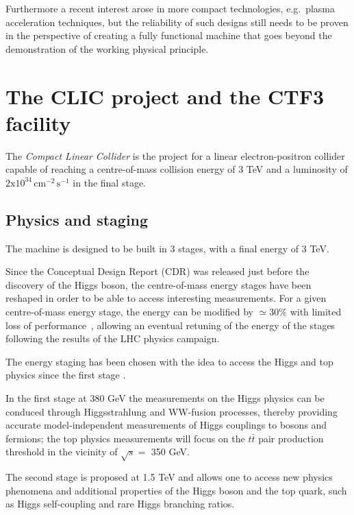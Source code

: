 Furthermore a recent interest arose in more compact technologies, e.g.~plasma acceleration techniques, but the reliability of such designs still needs to be proven in the perspective of creating a fully functional machine that goes beyond the demonstration of the working physical principle.



\section{The CLIC project and the CTF3 facility}

The \textit{Compact Linear Collider} is the project for a linear electron-positron collider capable of reaching a centre-of-mass collision energy of 3 TeV and a luminosity of $2\text{x}10^{34} \, \text{cm}^{-2} \, \text{s}^{-1}$ in the final stage.

\subsection{Physics and staging}

The machine is designed to be built in 3 stages, with a final energy of 3 TeV. 

Since the Conceptual Design Report (CDR)\cite{CLIC:cdr} was released just before the discovery of the Higgs boson, the centre-of-mass energy stages have been reshaped in order to be able to access interesting measurements. For a given centre-of-mass energy stage, the energy can be modified by $\simeq 30\%$ with limited loss of performance~\cite{CLIC:cdrVol3}, allowing an eventual retuning of the energy of the stages following the results of the LHC physics campaign.

The energy staging has been chosen with the idea to access the Higgs and top physics since the first stage \cite{CLIC:staging2016,Bozovic-Jelisavcic:2160172}.

In the first stage at 380 GeV the measurements on the Higgs physics can be conduced through Higgsstrahlung and WW-fusion processes, thereby providing accurate model-independent measurements of Higgs couplings to bosons and fermions\cite{Roloff:2210491}; the top physics measurements will focus on the $t\bar{t}$ pair production threshold in the vicinity of $\sqrt{s} = $ 350 GeV.

The second stage is proposed at 1.5 TeV and allows one to access new physics phenomena and additional properties of the Higgs boson and the top quark, such as Higgs self-coupling and rare Higgs branching ratios.

